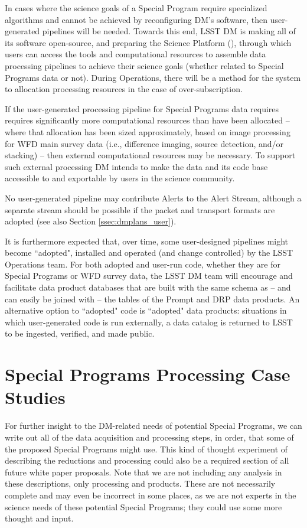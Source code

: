 \documentclass[DM,lsstdoc,toc]{lsstdoc}
\begin{document}
In cases where the science goals of a Special Program require specialized algorithms and cannot be achieved by reconfiguring DM's software, then user-generated pipelines will be needed.
Towards this end, LSST DM is making all of its software open-source, and preparing the Science Platform (), through which users can access the tools and computational resources to assemble data processing pipelines to achieve their science goals (whether related to Special Programs data or not).
During Operations, there will be a method for the system to allocation processing resources in the case of over-subscription.

If the user-generated processing pipeline for Special Programs data requires requires significantly more computational resources than have been allocated -- where that allocation has been sized approximately, based on image processing for WFD main survey data (i.e., difference imaging, source detection, and/or stacking) -- then external computational resources may be necessary.
To support such external processing DM intends to make the data and its code base accessible to and exportable by users in the science community.

No user-generated pipeline may contribute Alerts to the Alert Stream, although a separate stream should be possible if the packet and transport formats are adopted (see also Section \ref{ssec:dmplans_user}).

It is furthermore expected that, over time, some user-designed pipelines might become ``adopted", installed and operated (and change controlled) by the LSST Operations team.
For both adopted and user-run code, whether they are for Special Programs or WFD survey data, the LSST DM team will encourage and facilitate data product databases that are built with the same schema as -- and can easily be joined with -- the tables of the Prompt and DRP data products.
An alternative option to ``adopted" code is ``adopted" data products: situations in which user-generated code is run externally, a data catalog is returned to LSST to be ingested, verified, and made public.

\clearpage
\section{Special Programs Processing Case Studies}\label{sec:SPCS}

For further insight to the DM-related needs of potential Special Programs, we can write out all of the data acquisition and processing steps, in order, that some of the proposed Special Programs might use. This kind of thought experiment of describing the reductions and processing could also be a required section of all future white paper proposals. Note that we are not including any analysis in these descriptions, only processing and products. These are not necessarily complete and may even be incorrect in some places, as we are not experts in the science needs of these potential Special Programs; they could use some more thought and input.
\end{document}
